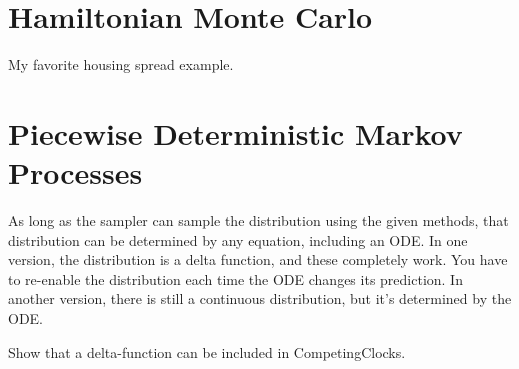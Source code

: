 \documentclass{article}
\begin{document}
\section{Hamiltonian Monte Carlo}

My favorite housing spread example.


\section{Piecewise Deterministic Markov Processes}

As long as the sampler can sample the distribution using the given methods, that distribution can be determined by any equation, including an ODE. In one version, the distribution is a delta function, and these completely work. You have to re-enable the distribution each time the ODE changes its prediction. In another version, there is still a continuous distribution, but it's determined by the ODE.

Show that a delta-function can be included in CompetingClocks.
\end{document}
